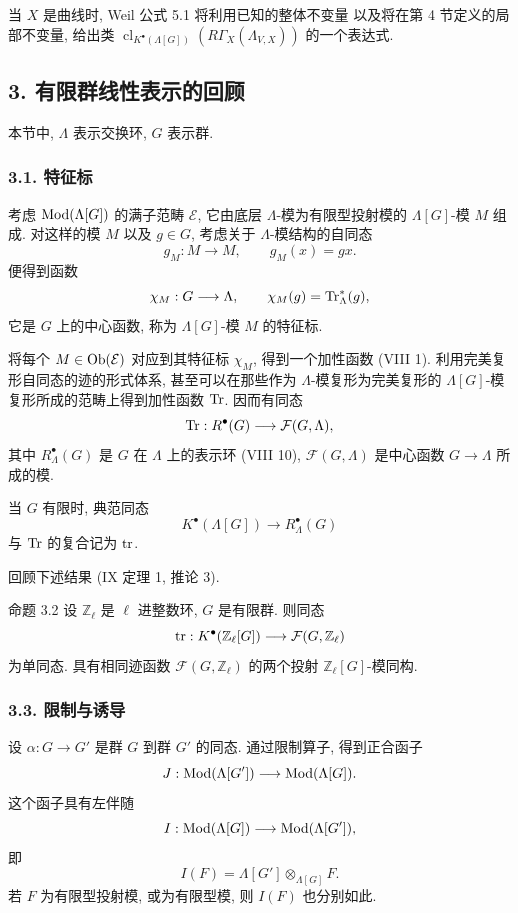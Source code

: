 当 $X$ 是曲线时, Weil 公式 5.1 将利用已知的整体不变量
以及将在第 4 节定义的局部不变量, 给出类 $\operatorname{cl}_{K^\bullet(\Lambda[G])}(R\Gamma_X(\Lambda_{V,X}))$
的一个表达式.


\subsection*{3. 有限群线性表示的回顾}

本节中, $\Lambda$ 表示交换环, $G$ 表示群.

\subsubsection*{3.1. 特征标}

考虑 $\operatorname{Mod}(\Lambda[G])$ 的满子范畴 $\mathcal E$, 它由底层 $\Lambda$-模为有限型投射模的 $\Lambda[G]$-模 $M$ 组成. 对这样的模 $M$ 以及 $g\in G$, 考虑关于 $\Lambda$-模结构的自同态
\[
g_M:M\longrightarrow M,
\qquad g_M(x)=gx.
\]
便得到函数
\[
\chi_M:G\longrightarrow \Lambda,
\qquad \chi_M(g)=\operatorname{Tr}^*_\Lambda(g),
\]
它是 $G$ 上的中心函数, 称为 $\Lambda[G]$-模 $M$ 的特征标.

将每个 $M\in\operatorname{Ob}(\mathcal E)$ 对应到其特征标 $\chi_M$, 得到一个加性函数 (VIII 1). 利用完美复形自同态的迹的形式体系, 甚至可以在那些作为 $\Lambda$-模复形为完美复形的 $\Lambda[G]$-模复形所成的范畴上得到加性函数 $\operatorname{Tr}$. 因而有同态
\[
\operatorname{Tr}:R^{\bullet}(G)\longrightarrow \mathcal F(G,\Lambda),
\]
其中 $R^{\bullet}_{\Lambda}(G)$ 是 $G$ 在 $\Lambda$ 上的表示环 (VIII 10), $\mathcal F(G,\Lambda)$ 是中心函数 $G\to\Lambda$ 所成的模.

当 $G$ 有限时, 典范同态
\[
K^{\bullet}(\Lambda[G])\longrightarrow R^{\bullet}_{\Lambda}(G)
\]
与 $\operatorname{Tr}$ 的复合记为 $\operatorname{tr}$.

回顾下述结果 (IX 定理 1, 推论 3).

\begin{statement}{命题 3.2}
设 $\mathbb Z_\ell$ 是 $\ell$ 进整数环, $G$ 是有限群. 则同态
\[
\operatorname{tr}:K^{\bullet}(\mathbb Z_\ell[G])\longrightarrow \mathcal F(G,\mathbb Z_\ell)
\]
为单同态. 具有相同迹函数 $\mathcal F(G,\mathbb Z_\ell)$ 的两个投射 $\mathbb Z_\ell[G]$-模同构.
\end{statement}

\subsubsection*{3.3. 限制与诱导}

设 $\alpha:G\to G'$ 是群 $G$ 到群 $G'$ 的同态. 通过限制算子, 得到正合函子
\[
J:\operatorname{Mod}(\Lambda[G'])\longrightarrow\operatorname{Mod}(\Lambda[G]).
\]
这个函子具有左伴随
\[
I:\operatorname{Mod}(\Lambda[G])\longrightarrow\operatorname{Mod}(\Lambda[G']),
\]
即
\[
I(F)=\Lambda[G']\otimes_{\Lambda[G]}F.
\]
若 $F$ 为有限型投射模, 或为有限型模, 则 $I(F)$ 也分别如此.

